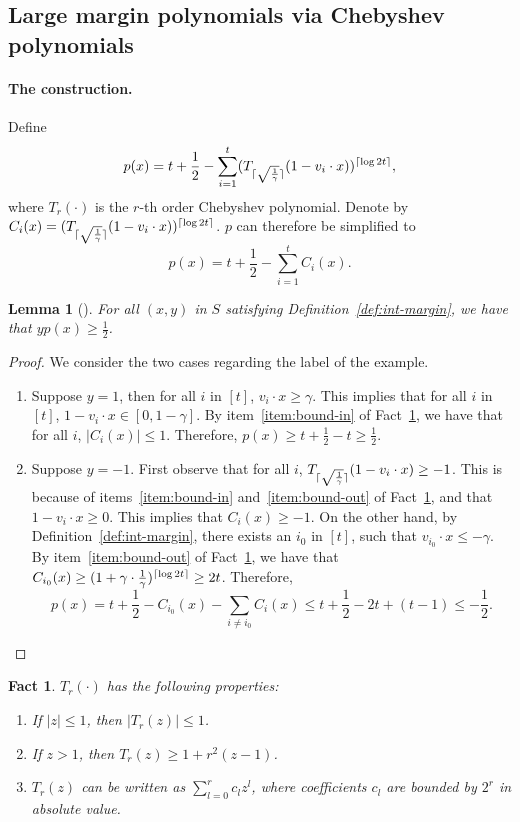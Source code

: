 \documentclass{article}
\DeclarePairedDelimiter\ceil{\lceil}{\rceil}
\newtheorem{lemma}[theorem]{Lemma}
\newtheorem{fact}[theorem]{Fact}
\begin{document}
\subsection{Large margin polynomials via Chebyshev polynomials}
\paragraph{The construction.} Define
\[ p(x) = t + \frac 1 2 - \sum_{i=1}^t (T_{\ceil{\sqrt{\frac 1 \gamma}}}(1 - v_i \cdot x))^{\ceil{\log 2t}}, \]
where
$T_r(\cdot)$ is the $r$-th order Chebyshev polynomial. Denote by $C_i(x) = (T_{\ceil{\sqrt{\frac 1 \gamma}}}(1 - v_i \cdot x))^{\ceil{\log 2t}}$. $p$ can therefore be simplified to
\[ p(x) = t + \frac 1 2 - \sum_{i=1}^t C_i(x). \]

\begin{lemma}[\cite{klivans2004learning}]
For all $(x,y)$ in $S$ satisfying Definition~\ref{def:int-margin}, we have that $y p(x) \geq \frac 1 2$.
\label{lem:cheb-margin}
\end{lemma}
\begin{proof}
We consider the two cases regarding the label of the example.
\begin{enumerate}
\item Suppose $y = 1$, then for all $i$ in $[t]$, $v_i \cdot x \geq \gamma$. This implies that for all
$i$ in $[t]$, $1 - v_i \cdot x \in [0, 1-\gamma]$. By item~\ref{item:bound-in} of Fact~\ref{fact:cheb}, we have that for all $i$, $|C_i(x)| \leq 1$.
Therefore, $p(x) \geq t + \frac 1 2 - t \geq \frac 1 2$.

\item Suppose $y = -1$. First observe that for all $i$, $T_{\ceil{\sqrt{\frac 1 \gamma}}}(1 - v_i \cdot x) \geq -1$. This is because of items~\ref{item:bound-in} and~\ref{item:bound-out} of Fact~\ref{fact:cheb}, and that $1 - v_i \cdot x \geq 0$.
This implies that $C_i(x) \geq -1$.
On the other hand, by Definition~\ref{def:int-margin}, there exists an $i_0$ in $[t]$, such that $v_{i_0} \cdot x \leq -\gamma$. By item~\ref{item:bound-out} of Fact~\ref{fact:cheb}, we have that
$C_{i_0}(x) \geq (1 + \gamma \cdot \frac 1 \gamma)^{\ceil{\log 2t}} \geq 2t$. Therefore,
\[ p(x) = t + \frac 1 2 - C_{i_0}(x) - \sum_{i \neq i_0} C_i(x) \leq t + \frac 1 2 - 2t + (t-1) \leq -\frac 1 2. \]
\end{enumerate}
\end{proof}

\begin{fact}
$T_r(\cdot)$ has the following properties:
\begin{enumerate}
  \item If $|z| \leq 1$, then $|T_r(z)| \leq 1$. \label{item:bound-in}
  \item If $z > 1$, then $T_r(z) \geq 1 + r^2 (z-1)$. \label{item:bound-out}
  \item $T_r(z)$ can be written as $\sum_{l=0}^r c_l z^l$, where coefficients $c_l$ are bounded by $2^r$ in absolute value.
\end{enumerate}
\label{fact:cheb}
\end{fact}
\end{document}
